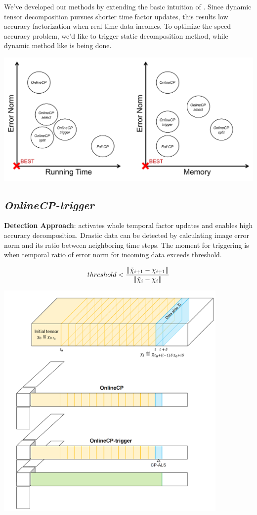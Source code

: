 
We've developed our methods by extending the basic intuition of \ocp. Since dynamic tensor decomposition pursues shorter time factor updates, this results low accuracy factorization when real-time data incomes. To optimize the speed accuracy problem, we'd like to trigger static decomposition method, \cpals while dynamic method like \ocp is being done.

\begin{center}
	\includegraphics[width=1\textwidth]{FIG/Method-optimization.pdf}
\end{center}

\newpage
\subsection{\em OnlineCP-trigger}
\textbf{Detection Approach}: \cpals activates whole temporal factor updates and enables high accuracy decomposition. Drastic data can be detected by calculating image error norm and its ratio between neighboring time steps. The moment for triggering \cpals is when temporal ratio of error norm for incoming data exceeds threshold.

\begin{align*}
    threshold < \frac{\left\lVert\tilde{\chi}_{i+1}-\chi_{i+1}\right\rVert}{\left\lVert\tilde{\chi}_{i}-\chi_{i}\right\rVert}
\end{align*}

\begin{center}
	\includegraphics[width=0.85\textwidth]{FIG/OnlineCP-trigger.png}
\end{center}

